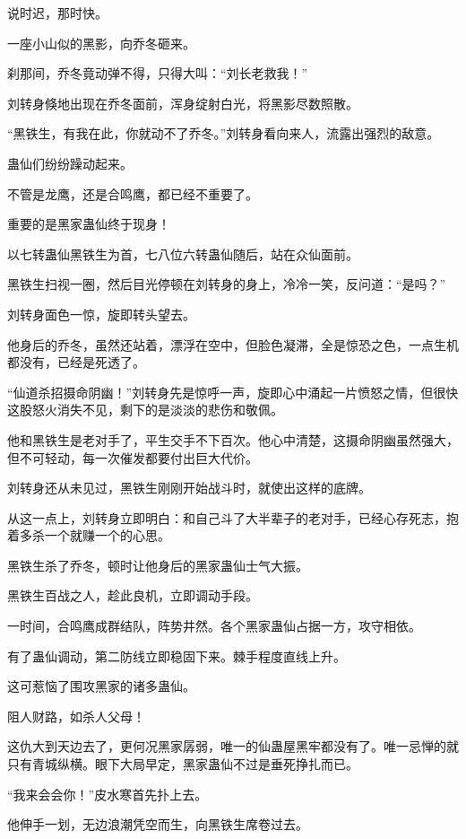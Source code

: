
\begin{this_body}

说时迟，那时快。

一座小山似的黑影，向乔冬砸来。

刹那间，乔冬竟动弹不得，只得大叫：“刘长老救我！”

刘转身倏地出现在乔冬面前，浑身绽射白光，将黑影尽数照散。

“黑铁生，有我在此，你就动不了乔冬。”刘转身看向来人，流露出强烈的敌意。

蛊仙们纷纷躁动起来。

不管是龙鹰，还是合鸣鹰，都已经不重要了。

重要的是黑家蛊仙终于现身！

以七转蛊仙黑铁生为首，七八位六转蛊仙随后，站在众仙面前。

黑铁生扫视一圈，然后目光停顿在刘转身的身上，冷冷一笑，反问道：“是吗？”

刘转身面色一惊，旋即转头望去。

他身后的乔冬，虽然还站着，漂浮在空中，但脸色凝滞，全是惊恐之色，一点生机都没有，已经是死透了。

“仙道杀招摄命阴幽！”刘转身先是惊呼一声，旋即心中涌起一片愤怒之情，但很快这股怒火消失不见，剩下的是淡淡的悲伤和敬佩。

他和黑铁生是老对手了，平生交手不下百次。他心中清楚，这摄命阴幽虽然强大，但不可轻动，每一次催发都要付出巨大代价。

刘转身还从未见过，黑铁生刚刚开始战斗时，就使出这样的底牌。

从这一点上，刘转身立即明白：和自己斗了大半辈子的老对手，已经心存死志，抱着多杀一个就赚一个的心思。

黑铁生杀了乔冬，顿时让他身后的黑家蛊仙士气大振。

黑铁生百战之人，趁此良机，立即调动手段。

一时间，合鸣鹰成群结队，阵势井然。各个黑家蛊仙占据一方，攻守相依。

有了蛊仙调动，第二防线立即稳固下来。棘手程度直线上升。

这可惹恼了围攻黑家的诸多蛊仙。

阻人财路，如杀人父母！

这仇大到天边去了，更何况黑家孱弱，唯一的仙蛊屋黑牢都没有了。唯一忌惮的就只有青城纵横。眼下大局早定，黑家蛊仙不过是垂死挣扎而已。

“我来会会你！”皮水寒首先扑上去。

他伸手一划，无边浪潮凭空而生，向黑铁生席卷过去。


\end{this_body}
